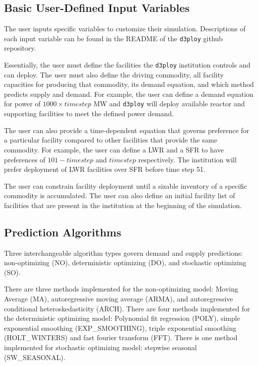 \documentclass[11pt,letterpaper]{article}
\newcommand{\deploy}{\texttt{d3ploy}\xspace}%
\begin{document}
\subsection{\textbf{Basic User-Defined Input Variables}}
The user inputs specific variables to customize their
simulation. 
Descriptions of each input variable can be found in the 
README of the \deploy github repository.

Essentially, the user must define the facilities the 
\deploy institution controls and can deploy. 
The user must also define the driving commodity, all facility capacities 
for producing that commodity, its demand 
equation, and which method predicts supply and demand. 
For example, the user can define a demand equation for power of 
$1000 \times timestep$ MW and \deploy will deploy available reactor and supporting 
facilities to meet the defined power demand. 

The user can also provide a time-dependent equation that governs
preference for a particular facility compared to other facilities that 
provide the same commodity. 
For example, the user can define a \gls{LWR} and a \gls{SFR} to have
preferences of $101 - timestep$ and $timestep$ respectively. 
The institution will prefer deployment of \gls{LWR} facilities over 
\gls{SFR} before time step 51. 

The user can constrain facility deployment 
until a sizable inventory of a specific commodity is accumulated.  
The user can also define an initial facility list of facilities that 
are present in the institution at the beginning of the simulation. 

\subsection{\textbf{Prediction Algorithms}}
Three interchangeable algorithm types govern demand and supply 
predictions: non-optimizing (NO), deterministic optimizing (DO), and stochastic
optimizing (SO). 

There are three methods implemented for the non-optimizing model: 
Moving Average (MA), autoregressive moving average (ARMA), and autoregressive 
conditional heteroskedasticity (ARCH).
There are four methods implemented for the deterministic optimizing model: 
Polynomial fit regression (POLY), simple exponential smoothing (EXP\_SMOOTHING),  
triple exponential smoothing (HOLT\_WINTERS) and fast fourier 
transform (FFT). 
There is one method implemented for stochastic optimizing model: 
stepwise seasonal (SW\_SEASONAL).  
\end{document}

